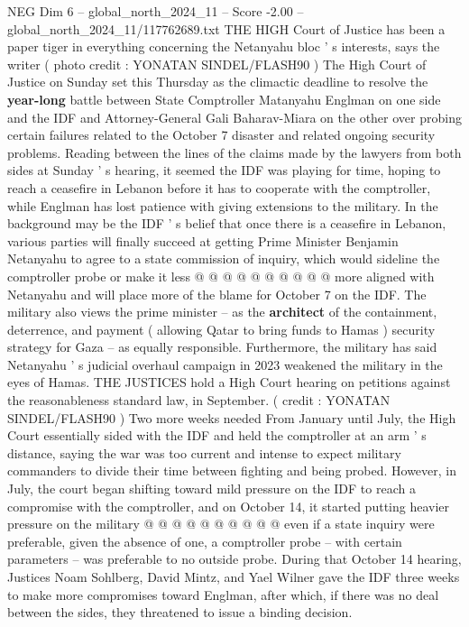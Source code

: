 \begin{textsample}{NEG Dim 6 – global\_north\_2024\_11 – Score -2.00 – global\_north\_2024\_11/117762689.txt}  \label{ex:f6_neg_157}
THE HIGH Court of Justice has been a paper tiger in everything concerning the Netanyahu bloc ' s interests, says the writer ( photo credit : YONATAN SINDEL/FLASH90 ) The High Court of Justice on Sunday set this Thursday as the climactic deadline to resolve the \textbf{year-long} battle between State Comptroller Matanyahu Englman on one side and the IDF and Attorney-General Gali Baharav-Miara on the other over probing certain failures related to the October 7 disaster and related ongoing security problems.
Reading between the lines of the claims made by the lawyers from both sides at Sunday ' s hearing, it seemed the IDF was playing for time, hoping to reach a ceasefire in Lebanon before it has to cooperate with the comptroller, while Englman has lost patience with giving extensions to the military.
In the background may be the IDF ' s belief that once there is a ceasefire in Lebanon, various parties will finally succeed at getting Prime Minister Benjamin Netanyahu to agree to a state commission of inquiry, which would sideline the comptroller probe or make it less @ @ @ @ @ @ @ @ @ @ more aligned with Netanyahu and will place more of the blame for October 7 on the IDF.
The military also views the prime minister -- as the \textbf{architect} of the containment, deterrence, and payment ( allowing Qatar to bring funds to Hamas ) security strategy for Gaza -- as equally responsible.
Furthermore, the military has said Netanyahu ' s judicial overhaul campaign in 2023 weakened the military in the eyes of Hamas.
THE JUSTICES hold a High Court hearing on petitions against the reasonableness standard law, in September. ( credit : YONATAN SINDEL/FLASH90 ) Two more weeks needed From January until July, the High Court essentially sided with the IDF and held the comptroller at an arm ' s distance, saying the war was too current and intense to expect military commanders to divide their time between fighting and being probed.
However, in July, the court began shifting toward mild pressure on the IDF to reach a compromise with the comptroller, and on October 14, it started putting heavier pressure on the military @ @ @ @ @ @ @ @ @ @ even if a state inquiry were preferable, given the absence of one, a comptroller probe -- with certain parameters -- was preferable to no outside probe.
During that October 14 hearing, Justices Noam Sohlberg, David Mintz, and Yael Wilner gave the IDF three weeks to make more compromises toward Englman, after which, if there was no deal between the sides, they threatened to issue a binding decision.

\end{textsample}
